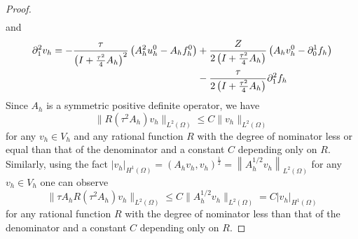 \documentclass{imanum}
\begin{document}
\begin{proof}
\begin{align}
  \end{align}
and
\begin{align}
  \label{expd2v}{\partial}^2_1 v_h = -\frac{\tau}{\left( I +
  \frac{\tau^2}{4} A_h \right)^2}  \left(A_h^2 u^0_h - A_h f^0_h\right) &+ \frac{Z}{2 \left( I + \frac{\tau^2}{4} A_h \right)}  \left(A_h v^0_h - \partial^1_0
  f_h\right) \\
 \notag &- \frac{\tau}{2 \left( I + \frac{\tau^2}{4} A_h \right)}   \partial^2_1 f_h 
\end{align}
Since $A_h$ is a symmetric positive definite operator, we have
\[ \| R (\tau^2 A_h) v_h \|_{L^2(\Omega)} \leq C \| v_h \|_{L^2(\Omega)} \]
for any $v_h \in V_h$ and any rational function $R$ with the degree of nominator
less or equal than that of the denominator and a constant $C$ depending only
on $R$. 
Similarly, using the fact $| v_h
|_{H^1(\Omega)} = (A_hv_h,v_h)^\frac{1}{2}=\left\|A_h^{{1}/{2}} v_h\right\|_{L^2(\Omega)}$ for any $v_h\in V_h$ one can observe
\[ \| \tau A_h R (\tau^2 A_h) v_h \|_{L^2(\Omega)} 
\le C \| A_h^{1/2} v_h \|_{L^2(\Omega)} 
= C | v_h |_{H^1(\Omega)} \]
for any rational function $R$ with the degree of nominator
less than that of the denominator and a constant $C$ depending only on $R$. 


\end{proof}
\end{document}
